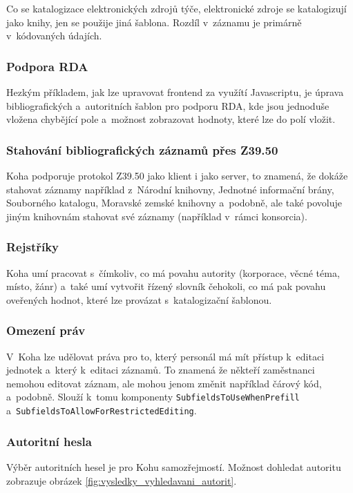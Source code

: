 \documentclass[
	11pt, oneside, printed, final, palatino, monochrome
	microtype,
	table,   %
	lof,     %
	lot     %
]{fithesis3}
\newcommand{\code}[1]{\texttt{#1}}
\begin{document}
{Co se katalogizace elektronických zdrojů týče, elektronické zdroje se katalogizují jako knihy, jen se použije jiná šablona. Rozdíl v~záznamu je primárně v~kódovaných údajích.

\subsubsection{Podpora RDA}
Hezkým příkladem, jak lze upravovat frontend za využítí Javascriptu, je úprava bibliografických a~autoritních šablon pro podporu RDA, kde jsou jednoduše vložena chybějící pole a~možnost zobrazovat hodnoty, které lze do polí vložit.

\subsubsection{Stahování bibliografických záznamů přes Z39.50}
Koha podporuje protokol Z39.50 jako klient i jako server, to znamená, že dokáže stahovat záznamy například z~Národní knihovny, Jednotné informační brány, Souborného katalogu, Moravské zemské knihovny a~podobně, ale také povoluje jiným knihovnám stahovat své záznamy (například v~rámci konsorcia).

\subsubsection{Rejstříky}
Koha umí pracovat s~čímkoliv, co má povahu autority (korporace, věcné téma, místo, žánr) a~také umí vytvořit řízený slovník čehokoli, co má pak povahu oveřených hodnot, které lze provázat s~katalogizační šablonou.

\subsubsection{Omezení práv}
V~Koha lze udělovat práva pro to, který personál má mít přístup k~editaci jednotek a~který k~editaci záznamů. To znamená že někteří zaměstnanci nemohou editovat záznam, ale mohou jenom změnit například čárový kód, a~podobně. Slouží k~tomu komponenty \code{SubfieldsToUseWhenPrefill} a~\code{SubfieldsToAllowForRestrictedEditing}.

\subsubsection{Autoritní hesla}
Výběr autoritních hesel je pro Kohu samozřejmostí. Možnost dohledat autoritu zobrazuje obrázek \ref{fig:vysledky_vyhledavani_autorit}.

}
\end{document}
